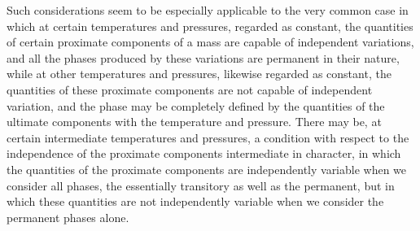 \documentclass[12pt]{article}
\begin{document}
Such considerations seem to be especially applicable to the very common case in which at certain temperatures and pressures, regarded as constant, the quantities of certain proximate components of a mass are capable of independent variations, and all the phases produced by these variations are permanent in their nature, while at other temperatures and pressures, likewise regarded as constant, the 
quantities of these proximate components are not capable of independent variation, and the phase may be completely defined by the quantities of the ultimate components with the temperature and pressure. There may be, at certain intermediate temperatures and pressures, a condition with respect to the independence of the proximate components intermediate in character, in which the quantities of the proximate components are independently variable when we consider all phases, the essentially transitory as well as the permanent, but in which these quantities are not independently variable when we consider the permanent phases alone. 
\end{document}
